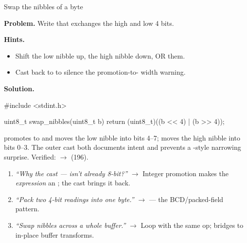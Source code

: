 \begin{gymproblem}{Swap the nibbles of a byte}

\textbf{Problem.} Write  that exchanges the
high and low 4 bits.

\textbf{Hints.}
\begin{itemize}
\item Shift the low nibble up, the high nibble down, OR them.
\item Cast back to  to silence the promotion-to-
  width warning.
\end{itemize}

\attempt

\textbf{Solution.}
\begin{cgym}
#include <stdint.h>

uint8_t swap_nibbles(uint8_t b) {
    return (uint8_t)((b << 4) | (b >> 4));
}
\end{cgym}

 promotes  to  and moves the low nibble into
bits 4--7;  moves the high nibble into bits 0--3. The outer
 cast both documents intent and prevents a
-style narrowing surprise. Verified:
 $\rightarrow$  (196).

\followups
\begin{enumerate}
\item \emph{``Why the cast --- isn't  already 8-bit?''} $\rightarrow$
  Integer promotion makes the \emph{expression} an ; the cast brings
  it back.
\item \emph{``Pack two 4-bit readings into one byte.''} $\rightarrow$
   --- the BCD/packed-field pattern.
\item \emph{``Swap nibbles across a whole buffer.''} $\rightarrow$ Loop with
  the same op; bridges to in-place buffer transforms.
\end{enumerate}
\end{gymproblem}

